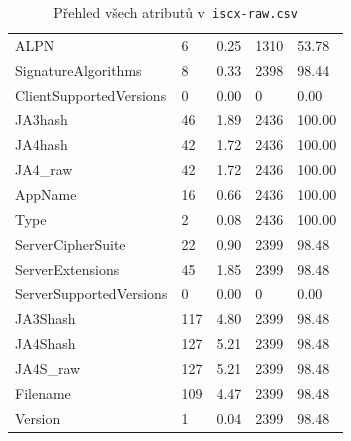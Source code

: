 \begin{table}[h!]
\begin{tabular}{lllll}
		ALPN                    & 6                                   & 0.25             & 1310                     & 53.78            \\
		SignatureAlgorithms     & 8                                   & 0.33             & 2398                     & 98.44            \\
		ClientSupportedVersions & 0                                   & 0.00             & 0                        & 0.00             \\
		JA3hash                 & 46                                  & 1.89             & 2436                     & 100.00           \\
		JA4hash                 & 42                                  & 1.72             & 2436                     & 100.00           \\
		JA4\_raw                & 42                                  & 1.72             & 2436                     & 100.00           \\
		AppName                 & 16                                  & 0.66             & 2436                     & 100.00           \\
		Type                    & 2                                   & 0.08             & 2436                     & 100.00           \\
		ServerCipherSuite       & 22                                  & 0.90             & 2399                     & 98.48            \\
		ServerExtensions        & 45                                  & 1.85             & 2399                     & 98.48            \\
		ServerSupportedVersions & 0                                   & 0.00             & 0                        & 0.00             \\
		JA3Shash                & 117                                 & 4.80             & 2399                     & 98.48            \\
		JA4Shash                & 127                                 & 5.21             & 2399                     & 98.48            \\
		JA4S\_raw               & 127                                 & 5.21             & 2399                     & 98.48            \\
		Filename                & 109                                 & 4.47             & 2399                     & 98.48            \\
		Version                 & 1                                   & 0.04             & 2399                     & 98.48            \\
		\bottomrule
	\end{tabular}
	\caption{Přehled všech atributů v~\texttt{iscx-raw.csv}}
	\label{tab:iscx-raw-appendix}
\end{table}
\newpage


